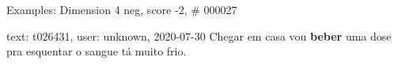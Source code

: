 \begin{frame}{Examples: Dimension 4 neg, score -2, \# 000027}
\footnotesize
\begin{alertblock}{text: t026431, user: unknown, 2020-07-30}
Chegar em casa vou \textbf{beber} uma dose pra esquentar o sangue tá muito 
frio. \textbf{} \textbf{} 
\end{alertblock}
\end{frame}
